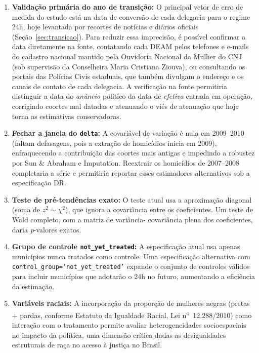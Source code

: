 \documentclass[twocolumn, 10pt]{article}
\begin{document}
\begin{enumerate}
  \item \textbf{Validação primária do ano de transição:} O principal vetor de
        erro de medida do estudo está na data de conversão de cada delegacia
        para o regime 24h, hoje levantada por recortes de notícias e diários
        oficiais (Seção~\ref{sec:transicao}). Para reduzir essa imprecisão, é
        possível confirmar a data diretamente na fonte, contatando cada DEAM
        pelos telefones e e-mails do cadastro nacional mantido pela Ouvidoria
        Nacional da Mulher do CNJ (sob supervisão da Conselheira Maria Cristiana
        Ziouva), ou consultando os portais das Polícias Civis estaduais, que
        também divulgam o endereço e os canais de contato de cada delegacia.
        A verificação na fonte permitiria distinguir a data do \textit{anúncio}
        político da data de \textit{efetiva} entrada em operação, corrigindo
        coortes mal datadas e atenuando o viés de atenuação que hoje torna as
        estimativas conservadoras.

  \item \textbf{Fechar a janela do \texttt{delta}:} A covariável de variação é
        nula em 2009--2010 (faltam defasagens, pois a extração de homicídios
        inicia em 2009), enfraquecendo a contribuição das coortes mais antigas
        e impedindo a robustez por Sun \& Abraham e Imputation. Reextrair os
        homicídios de 2007--2008 completaria a série e permitiria reportar esses
        estimadores alternativos sob a especificação DR.

  \item \textbf{Teste de pré-tendências exato:} O teste atual usa a aproximação
        diagonal (soma de $z^2 \sim \chi^2$), que ignora a covariância entre os
        coeficientes. Um teste de Wald completo, com a matriz de variância-
        covariância plena dos coeficientes, daria \textit{p}-valores exatos.

  \item \textbf{Grupo de controle \texttt{not\_yet\_treated}:} A especificação
        atual usa apenas municípios nunca tratados como controle. Uma
        especificação alternativa com \texttt{control\_group='not\_yet\_treated'}
        expande o conjunto de controles válidos para incluir municípios que
        adotarão o 24h no futuro, aumentando a eficiência da estimação.

  \item \textbf{Variáveis raciais:} A incorporação da proporção de mulheres
        negras (pretas + pardas, conforme Estatuto da Igualdade Racial,
        Lei n\textsuperscript{o}~12.288/2010) como interação com o tratamento
        permite avaliar heterogeneidades socioespaciais no impacto da política,
        uma dimensão crítica dadas as desigualdades estruturais de raça no
        acesso à justiça no Brasil.


\end{enumerate}
\end{document}
